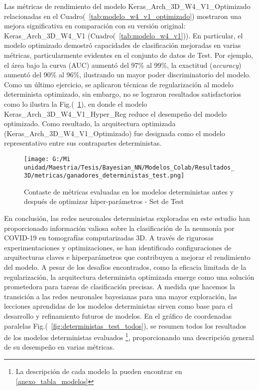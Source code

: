 \documentclass[10pt, oneside, a4paper]{article}
\begin{document}
	Las métricas de rendimiento del modelo Keras\_Arch\_3D\_W4\_V1\_Optimizado relacionadas en el Cuadro(~\ref{tab:modelo_w4_v1_optimizado}) mostraron una mejora significativa en comparación con su versión original: Keras\_Arch\_3D\_W4\_V1 (Cuadro(~\ref{tab:modelo_w4_v1})). En particular, el modelo optimizado demostró capacidades de clasificación mejoradas en varias métricas, particularmente evidentes en el conjunto de datos de Test. Por ejemplo, el área bajo la curva (AUC) aumentó del 97\% al 99\%, la exactitud (\textsl{accuracy}) aumentó del 90\% al 96\%, ilustrando un mayor poder discriminatorio del modelo. Como un último ejercicio, se aplicaron técnicas de regularización al modelo determinista optimizado, sin embargo, no se lograron resultados satisfactorios como lo ilustra la Fig.(~\ref{fig:deterministas_ganadores_test}), en donde el modelo Keras\_Arch\_3D\_W4\_V1\_Hyper\_Reg reduce el desempeño del modelo optimizado. Como resultado, la arquitectura optimizada (Keras\_Arch\_3D\_W4\_V1\_Optimizado) fue designada como el modelo representativo entre sus contrapartes deterministas.
	
	\begin{figure}[H]
	\centering
	\texttt{[image: G:/Mi unidad/Maestria/Tesis/Bayesian\_NN/Modelos\_Colab/Resultados\_3D/metricas/ganadores\_deterministas\_test.png]}
	\caption{Contaste de métricas evaluadas en los modelos deterministas antes y después de optimizar hiper-parámetros - Set de Test}
	\label{fig:deterministas_ganadores_test}
	\end{figure}
	
	En conclusión, las redes neuronales deterministas exploradas en este estudio han proporcionado información valiosa sobre la clasificación de la neumonía por COVID-19 en tomografías computarizadas 3D. A través de rigurosas experimentaciones y optimizaciones, se han identificado configuraciones de arquitecturas claves e hiperparámetros que contribuyen a mejorar el rendimiento del modelo. A pesar de los desafíos encontrados, como la eficacia limitada de la regularización, la arquitectura determinista optimizada emerge como una solución prometedora para tareas de clasificación precisas. A medida que hacemos la transición a las redes neuronales bayesianas para una mayor exploración, las lecciones aprendidas de los modelos deterministas sirven como base para el desarrollo y refinamiento futuros de modelos. En el gráfico de coordenadas paralelas Fig.(~\ref{fig:deterministas_test_todos}), se resumen todos los resultados de los modelos deterministas evaluados \footnote{La descripción de cada modelo la pueden encontrar en \ref{anexo_tabla_modelos}}, proporcionando una descripción general de su desempeño en varias métricas.
	
\end{document}

